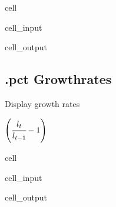 \documentclass[letterpaper,10pt,english]{jupyterBook}
\begin{document}
\begin{sphinxuseclass}{cell}\begin{sphinxVerbatimInput}

\begin{sphinxuseclass}{cell_input}
\begin{sphinxVerbatim}[commandchars=\\\{\}]
\PYG{p}{[}\PYG{p}{]}
\end{sphinxVerbatim}

\end{sphinxuseclass}\end{sphinxVerbatimInput}
\begin{sphinxVerbatimOutput}

\begin{sphinxuseclass}{cell_output}
\noindent{}

\noindent{}

\end{sphinxuseclass}\end{sphinxVerbatimOutput}

\end{sphinxuseclass}

\subsection{.pct  Growthrates}
\label{\detokenize{content/Python/modelflow_features:pct-growthrates}}
\sphinxAtStartPar
Display growth rates

\sphinxAtStartPar
\(\left(\cfrac{l_t}{l_{t-1}}-1\right )\)

\begin{sphinxuseclass}{cell}\begin{sphinxVerbatimInput}

\begin{sphinxuseclass}{cell_input}
\begin{sphinxVerbatim}[commandchars=\\\{\}]
\PYG{p}{[}\PYG{p}{]}
\end{sphinxVerbatim}

\end{sphinxuseclass}\end{sphinxVerbatimInput}
\begin{sphinxVerbatimOutput}

\begin{sphinxuseclass}{cell_output}
\noindent{}

\end{sphinxuseclass}\end{sphinxVerbatimOutput}

\end{sphinxuseclass}
\end{document}
